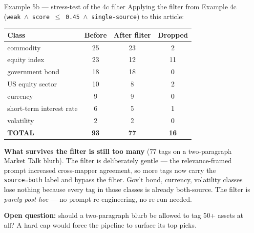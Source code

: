 \documentclass[10pt,aspectratio=169]{beamer}
\begin{document}
\begin{frame}{Example 5b --- stress-test of the 4c filter}
  \scriptsize
  Applying the filter from Example 4c (\texttt{weak $\wedge$ score $\leq$ 0.45 $\wedge$
  single-source}) to this article:

  \vspace{0.5em}
  \centering
  \setlength{\tabcolsep}{6pt}
  \renewcommand{\arraystretch}{1.15}
  \begin{tabular}{lccc}
    \toprule
    \textbf{Class} & \textbf{Before} & \textbf{After filter} & \textbf{Dropped} \\
    \midrule
    commodity                & 25 & 23 &  2 \\
    equity index             & 23 & 12 & 11 \\
    government bond          & 18 & 18 &  0 \\
    US equity sector         & 10 &  8 &  2 \\
    currency                 &  9 &  9 &  0 \\
    short-term interest rate &  6 &  5 &  1 \\
    volatility               &  2 &  2 &  0 \\
    \midrule
    \textbf{TOTAL}           & \textbf{93} & \textbf{77} & \textbf{16} \\
    \bottomrule
  \end{tabular}

  \vspace{0.6em}
  \raggedright
  \textcolor{goodgreen}{\textbf{What survives the filter is still too many}} (77 tags on a
  two-paragraph Market Talk blurb). The filter is deliberately gentle --- the relevance-framed
  prompt increased cross-mapper agreement, so more tags now carry the \texttt{source=both}
  label and bypass the filter. Gov't bond, currency, volatility classes lose nothing because
  every tag in those classes is already both-source. The filter is \emph{purely post-hoc} ---
  no prompt re-engineering, no re-run needed.

  \vspace{0.3em}
  \textbf{Open question:} should a two-paragraph blurb be allowed to tag 50+ assets at all?
  A hard cap would force the pipeline to surface its top picks.
\end{frame}
\end{document}
